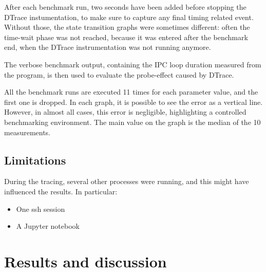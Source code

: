 \documentclass[a4paper,10pt]{article}
\begin{document}
After each benchmark run, two seconds have been added before stopping the DTrace instumentation, to make sure to capture any final timing related event. Without those, the state transition graphs were sometimes different: often the time-wait phase was not reached, because it was entered after the benchmark end, when the DTrace instrumentation was not running anymore.

The verbose benchmark output, containing the IPC loop duration measured from the program, is then used to evaluate the probe-effect caused by DTrace.


All the benchmark runs are executed 11 times for each parameter value, and the first one is dropped. In each graph, it is possible to see the error as a vertical line. However, in almost all cases, this error is negligible, highlighting a controlled benchmarking environment. The main value on the graph is the median of the 10 measurements.



\subsection{Limitations}

During the tracing, several other processes were running, and this might have influenced the results. In particular:
\begin{itemize}
    \item One ssh session
    \item A Jupyter notebook
\end{itemize}



\section{Results and discussion}
\end{document}
